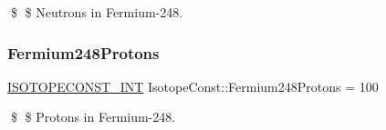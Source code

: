 \$ \$ Neutrons in Fermium-\/248. \mbox{\label{group___isotope_const-_fermium-_fm248_ga81d5ef1939886a7c7784f4e5fe2a8869}} 
\subsubsection{\texorpdfstring{Fermium248\+Protons}{Fermium248Protons}}
{\footnotesize\ttfamily \mbox{\hyperlink{group___isotope_const-_macros_ga5f18360b3e99483a35c32d789e62621c}{I\+S\+O\+T\+O\+P\+E\+C\+O\+N\+S\+T\+\_\+\+I\+NT}} Isotope\+Const\+::\+Fermium248\+Protons = 100}

\$ \$ Protons in Fermium-\/248. 